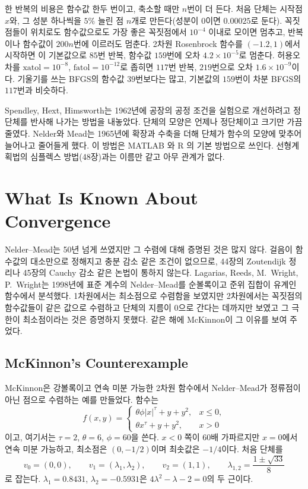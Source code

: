 한 반복의 비용은 함수값 한두 번이고, 축소할 때만 $n$번이 더 든다. 처음 단체는 시작점 $x$와, 그 성분 하나씩을 $5\%$ 늘린 점 $n$개로 만든다(성분이 $0$이면 $0.00025$로 둔다). 꼭짓점들이 위치로도 함수값으로도 가장 좋은 꼭짓점에서 $10^{-4}$ 이내로 모이면 멈추고, 반복이나 함수값이 $200n$번에 이르러도 멈춘다. 2차원 Rosenbrock 함수를 $(-1.2,1)$에서 시작하면 이 기본값으로 $85$번 반복, 함수값 $159$번에 오차 $4.2\times10^{-5}$로 멈춘다. 허용오차를 $\mathrm{xatol}=10^{-8}$, $\mathrm{fatol}=10^{-12}$로 좁히면 $117$번 반복, $219$번으로 오차 $1.6\times10^{-9}$이다. 기울기를 쓰는 BFGS의 함수값 $39$번보다는 많고, 기본값의 $159$번이 차분 BFGS의 $117$번과 비슷하다.

\begin{aside}[단체 방법의 두 갈래]
Spendley, Hext, Himsworth는 1962년에 공장의 공정 조건을 실험으로 개선하려고 정단체를 반사해 나가는 방법을 내놓았다\cite{spendley1962}. 단체의 모양은 언제나 정단체이고 크기만 가끔 줄였다. Nelder와 Mead는 1965년에 확장과 수축을 더해 단체가 함수의 모양에 맞추어 늘어나고 줄어들게 했다\cite{nelder1965}. 이 방법은 MATLAB 와 R 의 기본 방법으로 쓰인다. 선형계획법의 심플렉스 방법(48장)과는 이름만 같고 아무 관계가 없다.
\end{aside}

\section{What Is Known About Convergence}
\label{sec:nm-theory}

Nelder--Mead는 50년 넘게 쓰였지만 그 수렴에 대해 증명된 것은 많지 않다. 걸음이 함수값의 대소만으로 정해지고 충분 감소 같은 조건이 없으므로, 44장의 Zoutendijk 정리나 45장의 Cauchy 감소 같은 논법이 통하지 않는다. Lagarias, Reeds, M.\ Wright, P.\ Wright는 1998년에 표준 계수의 Nelder--Mead를 순볼록이고 준위 집합이 유계인 함수에서 분석했다\cite{lagarias1998}. 1차원에서는 최소점으로 수렴함을 보였지만 2차원에서는 꼭짓점의 함수값들이 같은 값으로 수렴하고 단체의 지름이 $0$으로 간다는 데까지만 보였고 그 극한이 최소점이라는 것은 증명하지 못했다. 같은 해에 McKinnon이 그 이유를 보여 주었다.

\subsection{McKinnon's Counterexample}

McKinnon은 강볼록이고 연속 미분 가능한 2차원 함수에서 Nelder--Mead가 정류점이 아닌 점으로 수렴하는 예를 만들었다\cite{mckinnon1998}. 함수는
\[
f(x,y)=\begin{cases}\theta\phi|x|^\tau+y+y^2,&x\le0,\\\theta x^\tau+y+y^2,&x>0\end{cases}
\]
이고, 여기서는 $\tau=2$, $\theta=6$, $\phi=60$을 쓴다. $x<0$ 쪽이 $60$배 가파르지만 $x=0$에서 연속 미분 가능하고, 최소점은 $(0,-1/2)$이며 최솟값은 $-1/4$이다. 처음 단체를
\[
v_0=(0,0),\qquad v_1=(\lambda_1,\lambda_2),\qquad v_2=(1,1),\qquad\lambda_{1,2}=\frac{1\pm\sqrt{33}}8
\]
로 잡는다. $\lambda_1=0.8431$, $\lambda_2=-0.5931$은 $4\lambda^2-\lambda-2=0$의 두 근이다.

